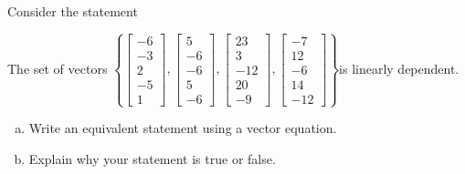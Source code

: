 
\begin{exerciseStatement}


Consider the statement 
\begin{center}\begin{minipage}{0.8\textwidth}
 The set of vectors \( \left\{ \left[\begin{array}{c}
-6 \\
-3 \\
2 \\
-5 \\
1
\end{array}\right] , \left[\begin{array}{c}
5 \\
-6 \\
-6 \\
5 \\
-6
\end{array}\right] , \left[\begin{array}{c}
23 \\
3 \\
-12 \\
20 \\
-9
\end{array}\right] , \left[\begin{array}{c}
-7 \\
12 \\
-6 \\
14 \\
-12
\end{array}\right] \right\} \)is linearly dependent.
\end{minipage}\end{center}
    


\begin{enumerate}[(a)]
\item  Write an equivalent statement using a vector equation.
\item  Explain why your statement is true or false.
\end{enumerate}
    
\end{exerciseStatement}
    
